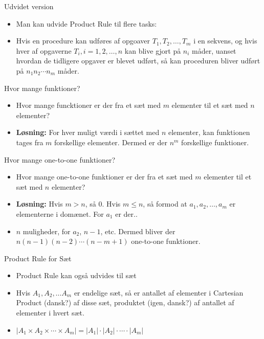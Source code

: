 \documentclass{beamer}
\begin{document}
\begin{frame}{Udvidet version}
   \begin{itemize}
       \item Man kan udvide Product Rule til flere tasks:
       \item Hvis en procedure kan udføres af opgoaver $T_1, T_2, \ldots, T_m$ i en sekvens, og hvis hver af opgaverne $T_i, i = 1,2,\ldots,n$ kan blive gjort på $n_i$ måder, uanset hvordan de tidligere opgaver er blevet udført, så kan proceduren bliver udført på $n_1n_2 \cdots n_m$ måder.
   \end{itemize} 
\end{frame}

\begin{frame}{Hvor mange funktioner?}
   \begin{itemize}
       \item<1-> Hvor mange funcktioner er der fra et sæt med $m$ elementer til et sæt med $n$ elementer? 
       \item <2-> \textbf{Løsning:} For hver muligt værdi i sættet med $n$ elementer, kan funktionen tages fra $m$ forskellige elementer. Dermed er der $n^m$ forskellige funktioner.
   \end{itemize} 
\end{frame}

\begin{frame}{Hvor mange one-to-one funktioner?}
   \begin{itemize}
       \item<1-> Hvor mange one-to-one funktioner er der fra et sæt med $m$ elementer til et sæt med $n$ elementer? 
       \item <2-> \textbf{Løsning: } Hvis $m > n$, så 0. Hvis $m \leq n$, så formod at $a_1, a_2, \ldots, a_m$ er elementerne i domænet. For $a_1$ er der..
       \item <3-> $n$ muligheder, for $a_2$, $n-1$, etc. Dermed bliver der $n(n-1)(n-2) \cdots (n-m+1)$ one-to-one funktioner. 
   \end{itemize} 
\end{frame}

\begin{frame}{Product Rule for Sæt}
\begin{itemize}
    \item Product Rule kan også udvides til sæt
    \item Hvis $A_1, A_2, \ldots A_m$ er endelige sæt, så er antallet af elementer i Cartesian Product (dansk?) af disse sæt, produktet (igen, dansk?) af antallet af elementer i hvert sæt. 
    \item $|A_1 \times A_2 \times \cdots \times A_m| = |A_1| \cdot |A_2| \cdot \cdots \cdot |A_m|$
\end{itemize}
\end{frame}
\end{document}
